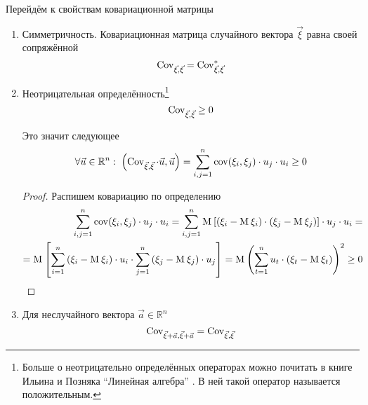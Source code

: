 Перейдём к свойствам ковариационной матрицы
\begin{enumerate}
  \item Симметричность. Ковариационная матрица случайного вектора $\vec{\xi}$
      равна своей сопряжённой
      $$\operatorname{Cov}^{}_{\vec{\xi}, \vec{\xi}} = \operatorname{Cov}^{*}_{\vec{\xi}, \vec{\xi}}$$
  \item Неотрицательная определённость\footnote{Больше о неотрицательно
      определённых операторах можно почитать в книге Ильина и Позняка
      ``Линейная алгебра'' \cite[с.~139]{IlinPoznyarLA}.
      В ней такой оператор называется положительным.}
      $$\operatorname{Cov}^{}_{\vec{\xi}, \vec{\xi}} \ge 0$$

      Это значит следующее
      $$\forall \vec{u} \in \mathbb{R}^n:\;
      \left( \operatorname{Cov}^{}_{\vec{\xi}, \vec{\xi}} \cdot \vec{u}, \vec{u} \right)
      = \sum_{i,j=1}^{n} \operatorname{cov}\!\left( \xi_i, \xi_j \right) \cdot u_j \cdot u_i
      \ge 0$$

      \begin{proof}
      Распишем ковариацию по определению
      \begin{align*}
          \sum_{i,j=1}^{n} \operatorname{cov}\!\left( \xi_i, \xi_j \right) \cdot u_j \cdot u_i
          = \sum_{i,j=1}^{n} \operatorname{M}_{} \left[ \left( \xi_i - \operatorname{M}_{} \xi_i \right)
            \cdot \left( \xi_j - \operatorname{M}_{} \xi_j \right) \right]
            \cdot u_j \cdot u_i = \\
          = \operatorname{M}_{} \left[ \sum_{i=1}^{n} \left( \xi_i - \operatorname{M}_{} \xi_i \right) \cdot u_i
            \cdot \sum_{j=1}^{n}\left( \xi_j - \operatorname{M}_{} \xi_j \right) \cdot u_j \right]
          = \operatorname{M}_{} \left( \sum_{t=1}^{n} u_t
            \cdot \left( \xi_t - \operatorname{M}_{} \xi_t \right) \right)^2
          \ge 0
      \end{align*}
      \end{proof}
  \item Для неслучайного вектора $\vec{a} \in \mathbb{R}^n$
      \begin{equation*}
        \operatorname{Cov}^{}_{\vec{\xi} + \vec{a}, \vec{\xi} + \vec{a}} = \operatorname{Cov}^{}_{\vec{\xi}, \vec{\xi}}
      \end{equation*}
\end{enumerate}

